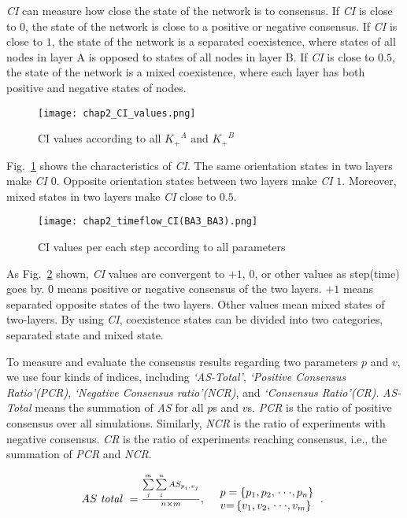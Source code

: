 \textit{CI} can measure how close the state of the network is to consensus. If \textit{CI} is close to $0$, the state of the network is close to a positive or negative consensus. If \textit{CI} is close to $1$, the state of the network is a separated coexistence, where states of all nodes in layer A is opposed to states of all nodes in layer B. If \textit{CI} is close to $0.5$, the state of the network is a mixed coexistence, where each layer has both positive and negative states of nodes.

\begin{figure}[!htb]
	\centering
	\texttt{[image: chap2\_CI\_values.png]}
	\caption{CI values according to all ${K_ + }^A$ and ${K_ + }^B$  }
	\label{chap2_CI_values}
\end{figure}

Fig.~\ref{chap2_CI_values} shows the characteristics of \textit{CI}. The same orientation states in two layers make \textit{CI} $0$. Opposite orientation states between two layers make \textit{CI} $1$. Moreover, mixed states in two layers make \textit{CI} close to $0.5$.

\begin{figure}[!htb]
	\centering
	\texttt{[image: chap2\_timeflow\_CI(BA3\_BA3).png]}
	\caption{CI values per each step according to all parameters}
	\label{chap2_timeflow_CI(BA3_BA3)}
\end{figure}

As Fig.~\ref{chap2_timeflow_CI(BA3_BA3)} shown, \textit{CI} values are convergent to $+1$, $0$, or other values as step(time) goes by. $0$ means positive or negative consensus of the two layers. $+1$ means separated opposite states of the two layers. Other values mean mixed states of two-layers. By using \textit{CI}, coexistence states can be divided into two categories, separated state and mixed state. 

To measure and evaluate the consensus results regarding two parameters $p$ and $v$, we use four kinds of indices, including \textit{`AS-Total'}, \textit{`Positive Consensus Ratio'(PCR)}, \textit{`Negative Consensus ratio'(NCR)}, and \textit{`Consensus Ratio'(CR)}. \textit{AS-Total} means the summation of \textit{AS} for all $p$s and $v$s. \textit{PCR} is the ratio of positive consensus over all simulations. Similarly, \textit{NCR} is the ratio of experiments with negative consensus. \textit{CR} is the ratio of experiments reaching consensus, i.e., the summation of \textit{PCR} and \textit{NCR}.

\begin{equation}
\begin{array}{cl}
AS\mbox{ \textit{total} } = \frac{{\sum\limits_j^m {\sum\limits_i^n {A{S_{{p _i},{v _j}}}} } }}{{n \times m }}, &
\begin{array}{l}
p  = \left\{ {{p _{\rm{1}}},{p _{\rm{2}}},\left. {\cdot\cdot\cdot,{p _n}} \right\}} \right.\\
v {\rm{ = }}\left\{ {{v _{\rm{1}}},{v _{\rm{2}}},\left. {\cdot\cdot\cdot,{v _m}} \right\}} \right.
\end{array}.\
\end{array}
\label{AS_total}
\end{equation}

